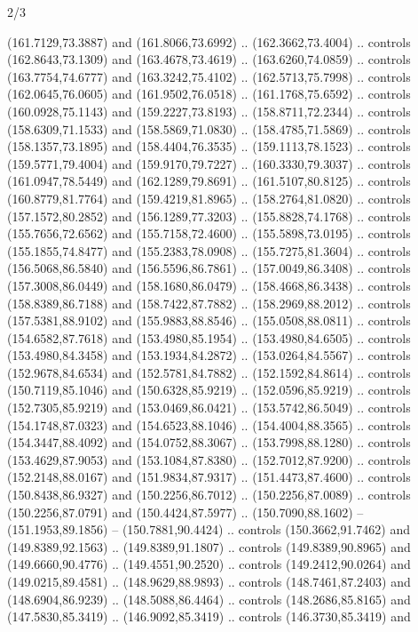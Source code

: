 \begin{flagdescription}{2/3}
\begin{scope}[xshift=0.5\flaglength,yshift=0.5\flagwidth,scale=\flagwidth/180]
\begin{scope}[y=0.8pt, x=0.8pt, yscale=-1,shift={(-168.75,-108.75)}]
  (161.7129,73.3887) and (161.8066,73.6992) .. (162.3662,73.4004) .. controls
  (162.8643,73.1309) and (163.4678,73.4619) .. (163.6260,74.0859) .. controls
  (163.7754,74.6777) and (163.3242,75.4102) .. (162.5713,75.7998) .. controls
  (162.0645,76.0605) and (161.9502,76.0518) .. (161.1768,75.6592) .. controls
  (160.0928,75.1143) and (159.2227,73.8193) .. (158.8711,72.2344) .. controls
  (158.6309,71.1533) and (158.5869,71.0830) .. (158.4785,71.5869) .. controls
  (158.1357,73.1895) and (158.4404,76.3535) .. (159.1113,78.1523) .. controls
  (159.5771,79.4004) and (159.9170,79.7227) .. (160.3330,79.3037) .. controls
  (161.0947,78.5449) and (162.1289,79.8691) .. (161.5107,80.8125) .. controls
  (160.8779,81.7764) and (159.4219,81.8965) .. (158.2764,81.0820) .. controls
  (157.1572,80.2852) and (156.1289,77.3203) .. (155.8828,74.1768) .. controls
  (155.7656,72.6562) and (155.7158,72.4600) .. (155.5898,73.0195) .. controls
  (155.1855,74.8477) and (155.2383,78.0908) .. (155.7275,81.3604) .. controls
  (156.5068,86.5840) and (156.5596,86.7861) .. (157.0049,86.3408) .. controls
  (157.3008,86.0449) and (158.1680,86.0479) .. (158.4668,86.3438) .. controls
  (158.8389,86.7188) and (158.7422,87.7882) .. (158.2969,88.2012) .. controls
  (157.5381,88.9102) and (155.9883,88.8546) .. (155.0508,88.0811) .. controls
  (154.6582,87.7618) and (153.4980,85.1954) .. (153.4980,84.6505) .. controls
  (153.4980,84.3458) and (153.1934,84.2872) .. (153.0264,84.5567) .. controls
  (152.9678,84.6534) and (152.5781,84.7882) .. (152.1592,84.8614) .. controls
  (150.7119,85.1046) and (150.6328,85.9219) .. (152.0596,85.9219) .. controls
  (152.7305,85.9219) and (153.0469,86.0421) .. (153.5742,86.5049) .. controls
  (154.1748,87.0323) and (154.6523,88.1046) .. (154.4004,88.3565) .. controls
  (154.3447,88.4092) and (154.0752,88.3067) .. (153.7998,88.1280) .. controls
  (153.4629,87.9053) and (153.1084,87.8380) .. (152.7012,87.9200) .. controls
  (152.2148,88.0167) and (151.9834,87.9317) .. (151.4473,87.4600) .. controls
  (150.8438,86.9327) and (150.2256,86.7012) .. (150.2256,87.0089) .. controls
  (150.2256,87.0791) and (150.4424,87.5977) .. (150.7090,88.1602) --
  (151.1953,89.1856) -- (150.7881,90.4424) .. controls (150.3662,91.7462) and
  (149.8389,92.1563) .. (149.8389,91.1807) .. controls (149.8389,90.8965) and
  (149.6660,90.4776) .. (149.4551,90.2520) .. controls (149.2412,90.0264) and
  (149.0215,89.4581) .. (148.9629,88.9893) .. controls (148.7461,87.2403) and
  (148.6904,86.9239) .. (148.5088,86.4464) .. controls (148.2686,85.8165) and
  (147.5830,85.3419) .. (146.9092,85.3419) .. controls (146.3730,85.3419) and

\end{scope}
\end{scope}
\end{flagdescription}
